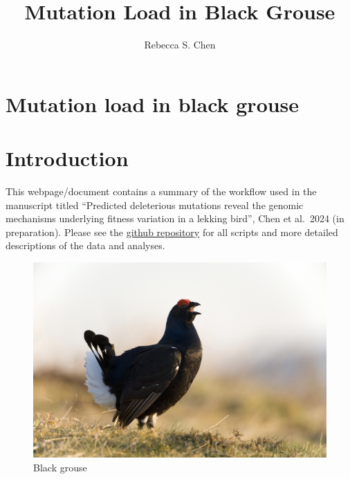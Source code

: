 \documentclass[
  letterpaper,
  DIV=11,
  numbers=noendperiod]{scrreprt}
\title{Mutation Load in Black Grouse}
\author{Rebecca S. Chen}
\date{}
\renewcommand*\contentsname{Table of contents}
\newcommand\contentsname{Table of contents}
\begin{document}
\maketitle
\ifdefined\Shaded\renewenvironment{Shaded}{\begin{tcolorbox}[interior hidden, sharp corners, boxrule=0pt, borderline west={3pt}{0pt}{shadecolor}, enhanced, frame hidden, breakable]}{\end{tcolorbox}}\fi

\renewcommand*\contentsname{Table of contents}
{
\hypersetup{linkcolor=}
\setcounter{tocdepth}{1}
\tableofcontents
}

\hypertarget{mutation-load-in-black-grouse}{%
\chapter{Mutation load in black
grouse}\label{mutation-load-in-black-grouse}}


\hypertarget{introduction}{%
\chapter{Introduction}\label{introduction}}

This webpage/document contains a summary of the workflow used in the
manuscript titled ``Predicted deleterious mutations reveal the genomic
mechanisms underlying fitness variation in a lekking bird'', Chen et
al.~2024 (in preparation). Please see the
\href{https://github.com/rshuhuachen/ms_load_grouse}{github repository}
for all scripts and more detailed descriptions of the data and analyses.

\begin{figure}

{\centering \includegraphics{plots/img/grouse.jpeg}

}

\caption{Black grouse}

\end{figure}
\end{document}
